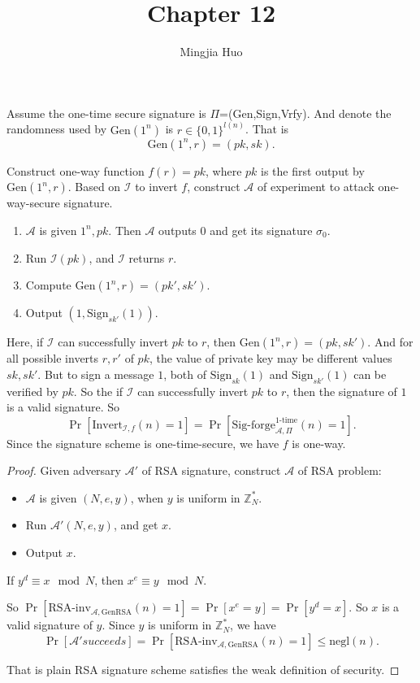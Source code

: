 \documentclass[a4paper]{article}
\newcommand{\negl}{\text{negl}}
\newcommand{\GenRSA}{\text{GenRSA}}
\newcommand{\Gen}{\text{Gen}}
\newcommand{\otime}{\text{1-time}}
\newcommand{\Invert}{\text{Invert}}
\newcommand{\Z}{\mathbb{Z}}
\newcommand{\I}{\mathcal{I}}
\newcommand{\A}{\mathcal{A}}
\newenvironment{problem}[2][Problem]{\begin{trivlist}
\item[\hskip \labelsep {\bfseries #1}\hskip \labelsep {\bfseries #2.}]}{\end{trivlist}}
\begin{document}
 
 
\title{Chapter 12}
\author{Mingjia Huo}
\date{}
\maketitle

\begin{problem}{12.2}
Assume the one-time secure signature is $\Pi$=(Gen,Sign,Vrfy). And denote the randomness used by $\Gen(1^n)$ is $r\in\{0,1\}^{l(n)}$. That is $$\Gen(1^n,r)=(pk,sk).$$\par
Construct one-way function $f(r)=pk$, where $pk$ is the first output by $\Gen(1^n,r)$. Based on $\I$ to invert $f$, construct $\A$ of experiment to attack one-way-secure signature.\par
\begin{enumerate}
    \item $\A$ is given $1^n,pk$. Then $\A$ outputs $0$ and get its signature $\sigma_0$.
    \item Run $\I(pk)$, and $\I$ returns $r$.
    \item Compute $\Gen(1^n,r)=(pk',sk')$.
    \item Output $(1,\text{Sign}_{sk'}(1))$.
\end{enumerate}
Here, if $\I$ can successfully invert $pk$ to $r$, then $\Gen(1^n,r)=(pk,sk')$. And for all possible inverts $r,r'$ of $pk$, the value of private key may be different values $sk,sk'$. But to sign a message $1$, both of $\text{Sign}_{sk}(1)$ and $\text{Sign}_{sk'}(1)$ can be verified by $pk$. So the if $\I$ can successfully invert $pk$ to $r$, then the signature of $1$ is a valid signature. So $$\Pr[\Invert_{\I,f}(n)=1]=\Pr[\text{Sig-forge}_{\A,\Pi}^{\otime}(n)=1].$$
Since the signature scheme is one-time-secure, we have $f$ is one-way.
\end{problem}

\begin{problem}{12.4}
\begin{proof}
Given adversary $\A'$ of RSA signature, construct $\A$ of RSA problem:\par
\begin{itemize}
    \item $\A$ is given $(N,e,y)$, when $y$ is uniform in $\Z_N^*$.
    \item Run $\A'(N,e,y)$, and get $x$.
    \item Output $x$.
\end{itemize}\par
If $y^d\equiv x\mod N$, then $x^e\equiv y\mod N$.\par
So $\Pr[\text{RSA-inv}_{\A,\GenRSA}(n)=1]=\Pr[x^e=y]=\Pr[y^d=x]$. So $x$ is a valid signature of $y$. Since $y$ is uniform in $\Z_N^*$, we have
$$\Pr[\A'succeeds]=\Pr[\text{RSA-inv}_{\A,\GenRSA}(n)=1]\le \negl(n).$$\par
That is plain RSA signature scheme satisfies the weak definition of security.
\end{proof}
\end{problem}
\end{document}
